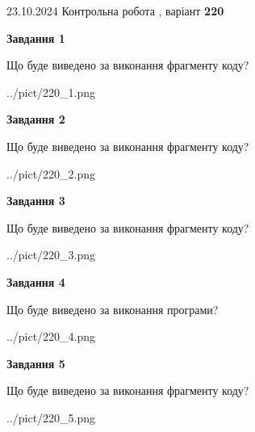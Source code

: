 \documentclass[12pt, ukrainian]{article}
\begin{document}
{\Large{23.10.2024 Контрольна робота , варіант  \No \textbf { 220 }\par}}
{
\begin {large}
{\begin {center}\textbf{Завдання 1}\end {center}}

Що буде виведено за виконання фрагменту коду?\par
\begin{center}
	{../pict/220_1.png}
\end{center}
\newpage

{\begin {center}\textbf{Завдання 2}\end {center}}

Що буде виведено за виконання фрагменту коду?\par
\begin{center}
	{../pict/220_2.png}
\end{center}
\newpage

{\begin {center}\textbf{Завдання 3}\end {center}}

Що буде виведено за виконання фрагменту коду?\par
\begin{center}
	{../pict/220_3.png}
\end{center}
\newpage

{\begin {center}\textbf{Завдання 4}\end {center}}

Що буде виведено за виконання програми?\par
\begin{center}
	{../pict/220_4.png}
\end{center}
\newpage

{\begin {center}\textbf{Завдання 5}\end {center}}

Що буде виведено за виконання фрагменту коду?\par
\begin{center}
	{../pict/220_5.png}
\end{center}
\newpage


\end{large}}
\end{document}
